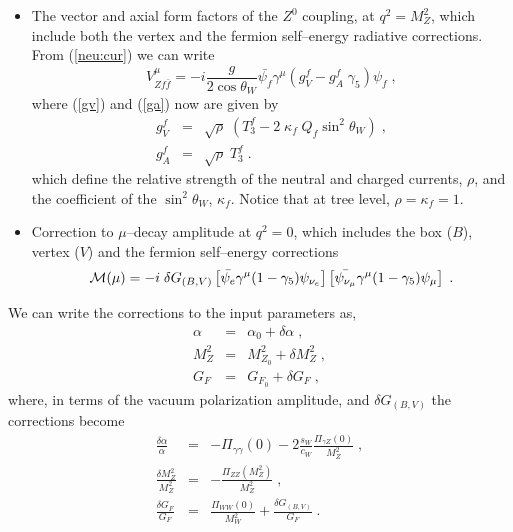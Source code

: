 \documentclass[12pt]{report}
\newcommand{\gc}{\gamma_5}
\newcommand{\g}{\gamma}
\begin{document}
\begin{itemize}
\item The vector and axial form factors of the $Z^0$ coupling, at $q^2
= M_Z^2$, which include both the vertex and the fermion self--energy
radiative corrections. From (\ref{neu:cur}) we can write
\[
V_{Zf\bar{f}}^\mu = - i \frac{g}{2 \cos\theta_W} 
         \bar{\psi_f} \g^\mu ( {  g_V^f} - 
                               {  g_A^f} \; \gc) \psi_f \; , 
\]
where (\ref{gv}) and (\ref{ga}) now are given by
\begin{eqnarray}
g_V^f & = & { \sqrt{\rho}} \; \left( T_3^f - 2 \; {\kappa_f} \;
Q_f \sin^2\theta_W \right) \; ,
\nonumber \\
g_A^f & = & { \sqrt{\rho}} \; T_3^f \; .
\label{cor:gvga}
\end{eqnarray}
which define the relative strength of the neutral and charged
currents, $\rho$, and the coefficient of the $\sin^2\theta_W$,
$\kappa_f$. Notice that at tree level, $\rho = \kappa_f =1$.

\item Correction to $\mu$--decay amplitude at $q^2 = 0$, which 
includes the box ($B$), vertex ($V$) and the fermion self--energy
corrections
\[
{\cal M} (\mu) = -i \; { \delta G_{(B,V)} }
\left[ \bar{\psi_e} \g^\mu (1 - \gc) \psi_{\nu_e} \right]
\left[ \bar{\psi_{\nu_\mu}} \g^\mu (1 - \gc) \psi_{\mu} \right] \; .
\]
\end{itemize}

We can write the corrections to the input parameters as,
\begin{eqnarray}
\alpha &=& \alpha_0 + { \delta \alpha}\; , \nonumber \\
M_Z^2 &=& M_{Z_0}^2 + { \delta M_Z^2} \; , \\
G_F &=& G_{F_0} + { \delta G_F}  \; ,    \nonumber 
\label{cor:imp:1}
\end{eqnarray}
where, in terms of the vacuum polarization amplitude, and $\delta
G_{(B,V)}$ the corrections become
\begin{eqnarray}
\frac{\delta \alpha}{\alpha} &=& - \Pi_{\gamma\gamma} (0) -  2
\frac{s_W}{c_W} \frac{\Pi_{\gamma Z} (0)}{M_Z^2} \; , \nonumber \\
\frac{\delta M_Z^2}{M_Z^2} &=& - \frac{\Pi_{ZZ}(M_Z^2)}{M_Z^2} \; ,  \\
\frac{\delta G_F}{G_F} &=& \frac{\Pi_{WW}(0)}{M_W^2}  +
\frac{\delta G_{(B,V)}}{G_F} \; . \nonumber
\label{cor:imp:2}
\end{eqnarray}              

\end{document}
